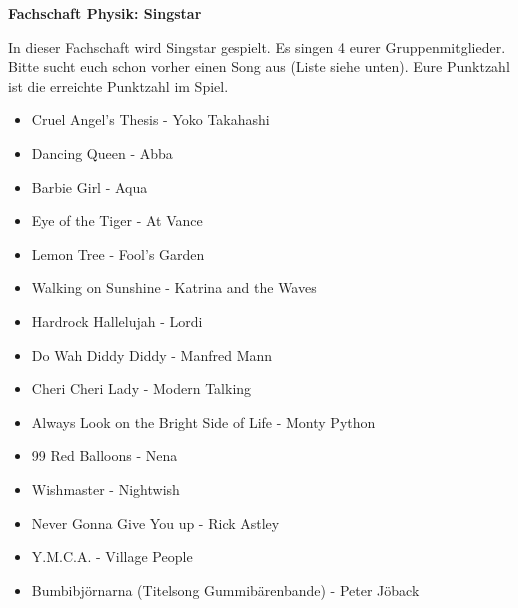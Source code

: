 \documentclass[a4paper,10pt]{article}
\begin{document}
\begin{center}
{\Huge \textbf{Fachschaft Physik: Singstar}}
\end{center}
\vspace{2cm}
{\LARGE
In dieser Fachschaft wird Singstar gespielt. Es singen 4 eurer Gruppenmitglieder. Bitte sucht euch schon vorher einen Song aus (Liste siehe unten). Eure Punktzahl ist die erreichte Punktzahl im Spiel.
\vspace{1cm}
\begin{itemize}
 \item Cruel Angel's Thesis - Yoko Takahashi

 \item Dancing Queen - Abba

 \item Barbie Girl - Aqua

 \item Eye of the Tiger - At Vance

 \item Lemon Tree - Fool's Garden

 \item Walking on Sunshine - Katrina and the Waves

 \item Hardrock Hallelujah - Lordi

 \item Do Wah Diddy Diddy - Manfred Mann

 \item Cheri Cheri Lady - Modern Talking

 \item Always Look on the Bright Side of Life - Monty Python

 \item 99 Red Balloons - Nena

 \item Wishmaster - Nightwish

 \item Never Gonna Give You up - Rick Astley

 \item Y.M.C.A. - Village People

 \item Bumbibjörnarna (Titelsong Gummibärenbande) - Peter Jöback

\end{itemize}

}

\pagebreak
\end{document}
